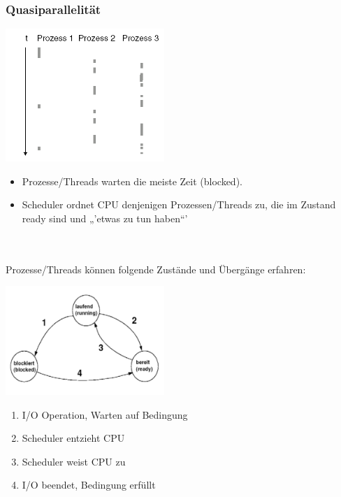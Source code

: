 \subsubsection{Quasiparallelität}
\begin{minipage}[c]{8cm}
\includegraphics[width=6cm]{images/Concurrency/Quasiparallelitaet.png}
\end{minipage}
\begin{minipage}[c]{10cm}
\begin{itemize}
\item Prozesse/Threads warten die meiste Zeit (blocked).
\item Scheduler ordnet CPU denjenigen Prozessen/Threads zu, die im Zustand ready sind und „'etwas zu tun haben“'
\end{itemize}
\end{minipage}\\\\
Prozesse/Threads können folgende Zustände und Übergänge erfahren:\\
\begin{minipage}[c]{8cm}
\includegraphics[width=6cm]{images/Concurrency/Prozesszustaende.png}
\end{minipage}
\begin{minipage}[c]{10cm}
\begin{enumerate}
\item I/O Operation, Warten auf Bedingung
\item Scheduler entzieht CPU
\item Scheduler weist CPU zu
\item I/O beendet, Bedingung erfüllt
\end{enumerate}
\end{minipage}

